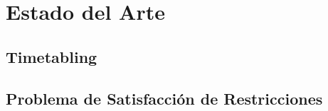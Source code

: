 \chapter{Estado del Arte}

\section{Timetabling}

\section{Problema de Satisfacción de Restricciones}
